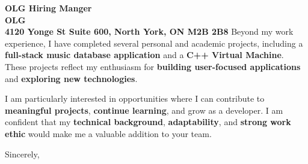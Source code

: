 \documentclass[11pt]{letter}
\newcommand{\hiringManager}{OLG Hiring Manger}
\newcommand{\companyName}{OLG}
\newcommand{\companyAddress}{4120 Yonge St Suite 600, North York, ON M2B 2B8}
\begin{document}
\begin{letter}{\textbf{\hiringManager \\ \companyName \\ \companyAddress}}
\hspace*{1cm} Beyond my work experience, I have completed several personal and academic projects, including a \textbf{full-stack music database application} and a \textbf{C++ Virtual Machine}. These projects reflect my enthusiasm for \textbf{building user-focused applications} and \textbf{exploring new technologies}.

\hspace*{1cm} I am particularly interested in opportunities where I can contribute to \textbf{meaningful projects}, \textbf{continue learning}, and grow as a developer. I am confident that my \textbf{technical background}, \textbf{adaptability}, and \textbf{strong work ethic} would make me a valuable addition to your team.
\closing{Sincerely,}

\end{letter}
\end{document}
